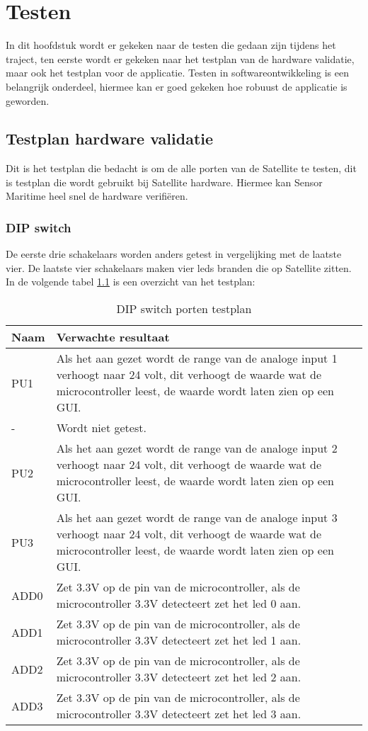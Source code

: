 \chapter{Testen}
In dit hoofdstuk wordt er gekeken naar de testen die gedaan zijn tijdens het traject, ten eerste wordt er gekeken naar het testplan van de hardware validatie, maar ook het testplan voor de applicatie. Testen in softwareontwikkeling is een belangrijk onderdeel, hiermee kan er goed gekeken hoe robuust de applicatie is geworden.

\section{Testplan hardware validatie} \label{sec:hwtestplan}
Dit is het testplan die bedacht is om de alle porten van de Satellite te testen, dit is testplan die wordt gebruikt bij Satellite hardware. Hiermee kan Sensor Maritime heel snel de hardware verifiëren.
\subsection{DIP switch}
De eerste drie schakelaars worden anders getest in vergelijking met de laatste vier. De laatste vier schakelaars maken vier leds branden die op Satellite zitten. In de volgende tabel \ref{tab:hw_val_dip_testplan} is een overzicht van het testplan:
\begin{table}[h!]
	\caption{DIP switch porten testplan}
	\begin{tabular}{lp{14.5cm}}
	\toprule
	\textbf{Naam} 	& \textbf{Verwachte resultaat} \\ \toprule
	PU1				& Als het aan gezet wordt de range van de analoge input 1 verhoogt naar 24 volt, dit verhoogt de waarde wat de microcontroller leest, de waarde wordt laten zien op een GUI.\\
	-				& Wordt niet getest. \\
	PU2				& Als het aan gezet wordt de range van de analoge input 2 verhoogt naar 24 volt, dit verhoogt de waarde wat de microcontroller leest, de waarde wordt laten zien op een GUI.\\
	PU3				& Als het aan gezet wordt de range van de analoge input 3 verhoogt  naar 24 volt, dit verhoogt de waarde wat de microcontroller leest, de waarde wordt laten zien op een GUI. \\
	ADD0 			& Zet 3.3V op de pin van de microcontroller, als de microcontroller 3.3V detecteert zet het led 0 aan.\\
	ADD1 			& Zet 3.3V op de pin van de microcontroller, als de microcontroller 3.3V detecteert zet het led 1 aan.\\
	ADD2 			& Zet 3.3V op de pin van de microcontroller, als de microcontroller 3.3V detecteert zet het led 2 aan.\\
	ADD3 			& Zet 3.3V op de pin van de microcontroller, als de microcontroller 3.3V detecteert zet het led 3 aan.\\ \bottomrule
	\end{tabular}
	\label{tab:hw_val_dip_testplan}
\end{table}

